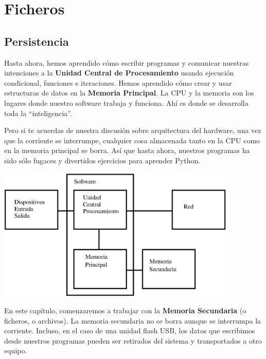 
\chapter{Ficheros}



\section{Persistencia}


Hasta ahora, hemos aprendido cómo escribir programas y comunicar
nuestras intenciones a la {\bf Unidad Central de Procesamiento} usando ejecución
condicional, funciones e iteraciones. Hemos aprendido cómo
crear y usar estructuras de datos en la {\bf Memoria Principal}. La CPU
y la memoria son los lugares donde nuestro software trabaja y funciona. Ahí es
donde se desarrolla toda la ``inteligencia''.

Pero si te acuerdas de nuestra discusión sobre arquitectura del hardware,
una vez que la corriente se interrumpe, cualquier cosa almacenada tanto
en la CPU como en la memoria principal se borra. Así que hasta ahora, nuestros
programas ha sido sólo fugaces y divertidos ejercicios para aprender Python.

\beforefig
\centerline{\includegraphics[height=2.50in]{figs2/arch3.eps}}
\afterfig

En este capítulo, comenzaremos a trabajar con la {\bf Memoria Secundaria}
(o ficheros, o archivos).
La memoria secundaria no se borra aunque se interrumpa la corriente.
Incluso, en el caso de una unidad flash USB, los
datos que escribimos desde nuestros programas pueden ser retirados
del sistema y transportados a otro equipo.

